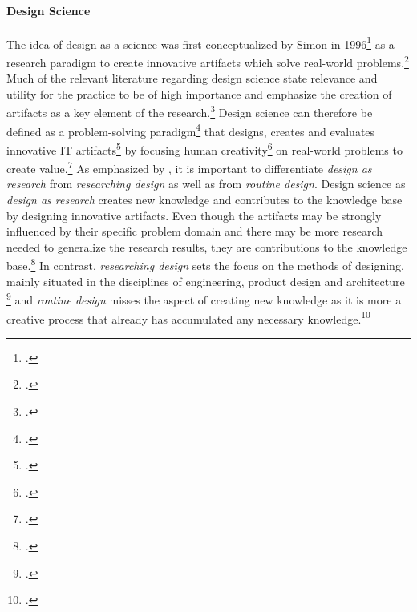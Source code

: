 \paragraph{Design Science}
The idea of design as a science was first conceptualized by Simon in 1996\footcite[Cf.][]{Simonsciencesartificial1996} as a research paradigm to create innovative artifacts which solve real-world problems.\footcite[Cf.][p.9]{HevnerDesignResearchInformation2010}
Much of the relevant literature regarding design science state relevance and utility for the practice to be of high importance and emphasize the creation of artifacts as a key element of the research.\footcites[Cf.][p.253, 254]{MarchDesignnaturalscience1995}[cf.][p.9, 11]{HevnerDesignResearchInformation2010}[cf.][p.77]{HevnerDesignScienceResearch2004}[cf.][p.1]{PapalambrosDesignScienceWhy2015}[cf.][p.330,342]{GregorPositioningpresentingdesign2013} Design science can therefore be defined as a problem-solving paradigm\footcite[Cf.][p.77]{HevnerDesignScienceResearch2004} that designs, creates and evaluates innovative IT artifacts\footcite[Cf.][p.90]{HevnerDesignScienceResearch2004} by focusing human creativity\footcite[Cf.][p.13]{HevnerDesignResearchInformation2010} on real-world problems to create value.\footcite[Cf.][p.1]{PapalambrosDesignScienceWhy2015} As emphasized by \cite{HevnerDesignResearchInformation2010}, it is important to differentiate \textit{design as research} from \textit{researching design} as well as from \textit{routine design}. Design science as \textit{design as research} creates new knowledge and contributes to the knowledge base by designing innovative artifacts. Even though the artifacts may be strongly influenced by their specific problem domain and there may be more research needed to generalize the research results, they are contributions to the knowledge base.\footcite[Cf.][p.15]{HevnerDesignResearchInformation2010} In contrast, \textit{researching design} sets the focus on the methods of designing, mainly situated in the disciplines of engineering, product design and architecture \footcite[Cf.][p.15]{HevnerDesignResearchInformation2010} and \textit{routine design} misses the aspect of creating new knowledge as it is more a creative process that already has accumulated any necessary knowledge.\footcite[Cf.][p.16]{HevnerDesignResearchInformation2010}

